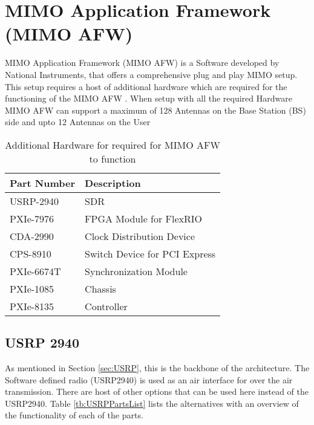 \section{MIMO Application Framework (MIMO AFW)}\label{sec:MIMOAFW}
MIMO Application Framework (MIMO AFW) is a Software developed by National Instruments, that offers a comprehensive plug and play MIMO setup. This setup requires a host of additional hardware which are required for the functioning of the MIMO AFW \cite{MIMOAFWGettingStarted}. When setup with all the required Hardware MIMO AFW can support a maximum of 128 Antennas on the Base Station (BS) side and upto 12 Antennas on the User 

\begin{table}[H]
    \begin{center}
        \begin{tabular}{|l|l|}
        \hline
            \textbf{Part Number} & \textbf{Description}          \\ \hline
            USRP-2940            & SDR                           \\ \hline
            PXIe-7976            & FPGA Module for FlexRIO       \\ \hline
            CDA-2990             & Clock Distribution Device     \\ \hline
            CPS-8910             & Switch Device for PCI Express \\ \hline
            PXIe-6674T           & Synchronization Module        \\ \hline
            PXIe-1085            & Chassis                       \\ \hline
            PXIe-8135            & Controller                    \\ \hline
        \end{tabular}
    \end{center}
    \caption{Additional Hardware for required for MIMO AFW to function}
    \label{tb:MIMOAFWPartsList}
\end{table}

\subsection{USRP 2940}\label{sec:MIMOAFWUSRP}
As mentioned in Section \ref{sec:USRP}, this is the backbone of the architecture. The Software defined radio (USRP2940) is used as an air interface for over the air transmission. There are host of other options that can be used here instead of the USRP2940. Table \ref{tb:USRPPartsList} lists the alternatives with an overview of the functionality of each of the parts.

